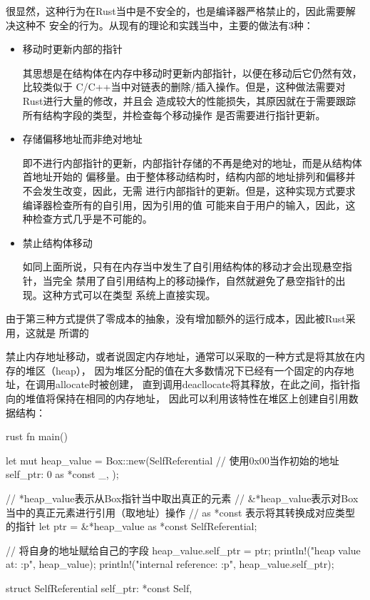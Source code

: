 很显然，这种行为在Rust当中是不安全的，也是编译器严格禁止的，因此需要解决这种不
安全的行为。从现有的理论和实践当中，主要的做法有3种：
\begin{itemize}
  \item 移动时更新内部的指针

  其思想是在结构体在内存中移动时更新内部指针，以便在移动后它仍然有效，比较类似于
  C/C++当中对链表的删除/插入操作。但是，这种做法需要对Rust进行大量的修改，并且会
  造成较大的性能损失，其原因就在于需要跟踪所有结构字段的类型，并检查每个移动操作
  是否需要进行指针更新。

  \item 存储偏移地址而非绝对地址

  即不进行内部指针的更新，内部指针存储的不再是绝对的地址，而是从结构体首地址开始的
  偏移量。由于整体移动结构时，结构内部的地址排列和偏移并不会发生改变，因此，无需
  进行内部指针的更新。但是，这种实现方式要求编译器检查所有的自引用，因为引用的值
  可能来自于用户的输入，因此，这种检查方式几乎是不可能的。

  \item 禁止结构体移动

  如同上面所说，只有在内存当中发生了自引用结构体的移动才会出现悬空指针，当完全
  禁用了自引用结构上的移动操作，自然就避免了悬空指针的出现。这种方式可以在类型
  系统上直接实现。
\end{itemize}

由于第三种方式提供了零成本的抽象，没有增加额外的运行成本，因此被Rust采用，这就是
所谓的

禁止内存地址移动，或者说固定内存地址，通常可以采取的一种方式是将其放在内存的堆区（heap），
因为堆区分配的值在大多数情况下已经有一个固定的内存地址，在调用allocate时被创建，
直到调用deacllocate将其释放，在此之间，指针指向的堆值将保持在相同的内存地址，
因此可以利用该特性在堆区上创建自引用数据结构：
\begin{code-block}{rust}
fn main() {

    let mut heap_value = Box::new(SelfReferential {
        // 使用0x00当作初始的地址
        self_ptr: 0 as *const _,
    });

    // *heap_value表示从Box指针当中取出真正的元素
    // &*heap_value表示对Box当中的真正元素进行引用（取地址）操作
    // as *const 表示将其转换成对应类型的指针
    let ptr = &*heap_value as *const SelfReferential;

    // 将自身的地址赋给自己的字段
    heap_value.self_ptr = ptr;
    println!("heap value at: {:p}", heap_value);
    println!("internal reference: {:p}", heap_value.self_ptr);
}

struct SelfReferential {
    self_ptr: *const Self,
}
\end{code-block}

